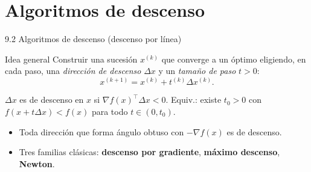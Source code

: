 \documentclass[10pt,aspectratio=169]{beamer}
\begin{document}
\section{Algoritmos de descenso}
\begin{frame}{9.2 Algoritmos de descenso (descenso por línea)}
  \begin{block}{Idea general}
    Construir una sucesión $x^{(k)}$ que converge a un óptimo eligiendo, en cada paso,
    una \emph{dirección de descenso} $\Delta x$ y un \emph{tamaño de paso} $t>0$:
    \[
      x^{(k+1)} = x^{(k)} + t^{(k)} \Delta x^{(k)}.
    \]
  \end{block}
  \begin{definition}
    $\Delta x$ es de descenso en $x$ si $\nabla f(x)^{\top} \Delta x < 0$.
    Equiv.: existe $t_{0}>0$ con $f(x + t\Delta x) < f(x)$ para todo $t \in (0,t_{0})$.
  \end{definition}
  \begin{itemize}
    \item Toda dirección que forma ángulo obtuso con $-\nabla f(x)$ es de descenso.
    \item Tres familias clásicas: \textbf{descenso por gradiente}, \textbf{máximo descenso}, \textbf{Newton}.
  \end{itemize}
\end{frame}
\end{document}
